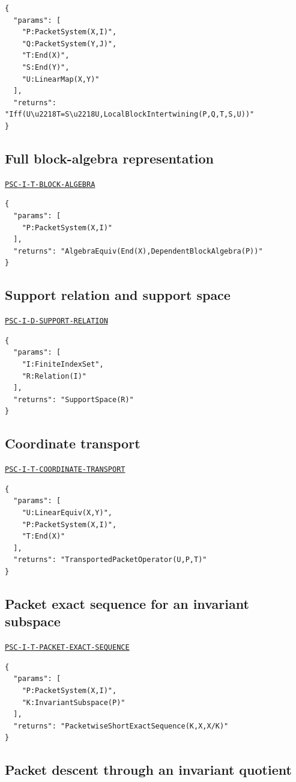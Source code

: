 \documentclass[a4paper,11pt]{article}
\begin{document}
\begin{lstlisting}
{
  "params": [
    "P:PacketSystem(X,I)",
    "Q:PacketSystem(Y,J)",
    "T:End(X)",
    "S:End(Y)",
    "U:LinearMap(X,Y)"
  ],
  "returns": "Iff(U\u2218T=S\u2218U,LocalBlockIntertwining(P,Q,T,S,U))"
}
\end{lstlisting}
\subsection*{Full block-algebra representation}
\hyperref[rec:PSC-I-T-BLOCK-ALGEBRA]{\nolinkurl{PSC-I-T-BLOCK-ALGEBRA}}
\begin{lstlisting}
{
  "params": [
    "P:PacketSystem(X,I)"
  ],
  "returns": "AlgebraEquiv(End(X),DependentBlockAlgebra(P))"
}
\end{lstlisting}
\subsection*{Support relation and support space}
\hyperref[rec:PSC-I-D-SUPPORT-RELATION]{\nolinkurl{PSC-I-D-SUPPORT-RELATION}}
\begin{lstlisting}
{
  "params": [
    "I:FiniteIndexSet",
    "R:Relation(I)"
  ],
  "returns": "SupportSpace(R)"
}
\end{lstlisting}
\subsection*{Coordinate transport}
\hyperref[rec:PSC-I-T-COORDINATE-TRANSPORT]{\nolinkurl{PSC-I-T-COORDINATE-TRANSPORT}}
\begin{lstlisting}
{
  "params": [
    "U:LinearEquiv(X,Y)",
    "P:PacketSystem(X,I)",
    "T:End(X)"
  ],
  "returns": "TransportedPacketOperator(U,P,T)"
}
\end{lstlisting}
\subsection*{Packet exact sequence for an invariant subspace}
\hyperref[rec:PSC-I-T-PACKET-EXACT-SEQUENCE]{\nolinkurl{PSC-I-T-PACKET-EXACT-SEQUENCE}}
\begin{lstlisting}
{
  "params": [
    "P:PacketSystem(X,I)",
    "K:InvariantSubspace(P)"
  ],
  "returns": "PacketwiseShortExactSequence(K,X,X/K)"
}
\end{lstlisting}
\subsection*{Packet descent through an invariant quotient}
\end{document}
